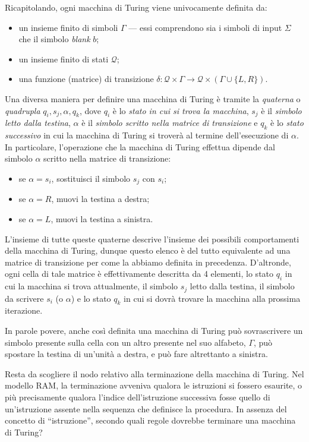\documentclass[10pt]{\classname}
\theoremstyle{newlinethm}
\theoremstyle{theorem}
\theoremstyle{definition}
\theoremstyle{definition}
\theoremstyle{definition}
\theoremstyle{definition}
\begin{document}
Ricapitolando, ogni macchina di Turing viene univocamente definita da:
\begin{itemize}
    \item un insieme finito di simboli $\Gamma$ --- essi comprendono sia i
        simboli di input $\Sigma$ che il simbolo \emph{blank} $b$;
    \item un insieme finito di stati $\mathcal Q$;
    \item una funzione (matrice) di transizione $\delta  : \mathcal Q \times
        \Gamma \rightarrow \mathcal Q \times (\Gamma \cup \{L,R\})$.
\end{itemize}

Una diversa maniera per definire una macchina di Turing è tramite la
\emph{quaterna} o \emph{quadrupla} $q_i, s_j, \alpha, q_k$, dove $q_i$ è lo
\emph{stato in cui si trova la macchina}, $s_j$ è il \emph{simbolo letto dalla
testina}, $\alpha$ è il \emph{simbolo scritto nella matrice di transizione} e
$q_k$ è lo \emph{stato successivo} in cui la macchina di Turing si troverà al
termine dell'esecuzione di $\alpha$. In particolare, l'operazione che la
macchina di Turing effettua dipende dal simbolo $\alpha$ scritto nella matrice
di transizione:
\begin{itemize}
    \item se $\alpha = s_i$, sostituisci il simbolo $s_j$ con $s_i$;
    \item se $\alpha = R$, muovi la testina a destra;
    \item se $\alpha = L$, muovi la testina a sinistra.
\end{itemize}

L'insieme di tutte queste quaterne descrive l'insieme dei possibili
comportamenti della macchina di Turing, dunque questo elenco è del tutto
equivalente ad una matrice di transizione per come la abbiamo definita in
precedenza. D'altronde, ogni cella di tale matrice è effettivamente descritta da 4 elementi, lo stato $q_i$ in cui la macchina si trova attualmente, il simbolo $s_j$ letto dalla testina, il simbolo da scrivere $s_i$ (o $\alpha$) e lo stato $q_k$ in cui si dovrà trovare la macchina alla prossima iterazione.

In parole povere, anche così definita una macchina di Turing può sovrascrivere
un simbolo presente sulla cella con un altro presente nel suo alfabeto,
$\Gamma$, può spostare la testina di un'unità a destra, e può fare altrettanto
a sinistra.

Resta da scogliere il nodo relativo alla terminazione della macchina di Turing.
Nel modello RAM, la terminazione avveniva qualora le istruzioni si fossero
esaurite, o più precisamente qualora l'indice dell'istruzione successiva fosse
quello di un'istruzione assente nella sequenza che definisce la procedura. In
assenza del concetto di ``istruzione'', secondo quali regole dovrebbe terminare
una macchina di Turing?
\end{document}
